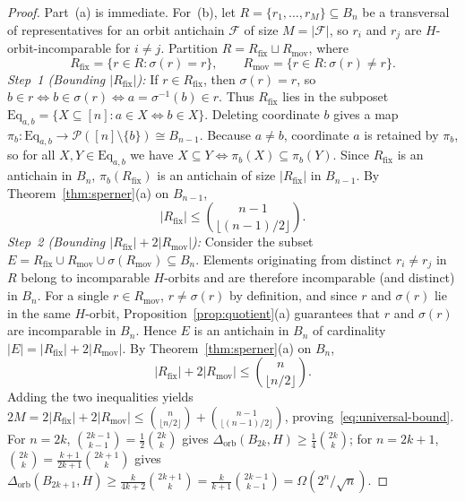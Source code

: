 \documentclass[11pt,a4paper]{article}
\theoremstyle{definition}
\newcommand{\Bn}{B_n}
\newcommand{\Dorb}{\Delta_{\mathrm{orb}}}
\begin{document}
\begin{proof}
Part~(a) is immediate. For~(b), let $R = \{r_1, \dots, r_M\} \subseteq \Bn$ be a transversal of representatives for an orbit antichain $\mathcal{F}$ of size $M = |\mathcal{F}|$, so $r_i$ and $r_j$ are $H$-orbit-incomparable for $i \neq j$. Partition $R = R_{\mathrm{fix}} \sqcup R_{\mathrm{mov}}$, where
\[
  R_{\mathrm{fix}} = \{r \in R : \sigma(r) = r\}, \qquad R_{\mathrm{mov}} = \{r \in R : \sigma(r) \neq r\}.
\]
\emph{Step~1 (Bounding $|R_{\mathrm{fix}}|$):} If $r \in R_{\mathrm{fix}}$, then $\sigma(r) = r$, so $b \in r \iff b \in \sigma(r) \iff a = \sigma^{-1}(b) \in r$. Thus $R_{\mathrm{fix}}$ lies in the subposet $\mathrm{Eq}_{a,b} = \{X \subseteq [n] : a \in X \iff b \in X\}$. Deleting coordinate $b$ gives a map $\pi_b : \mathrm{Eq}_{a,b} \to \mathcal{P}([n]\setminus\{b\}) \cong B_{n-1}$. Because $a \neq b$, coordinate $a$ is retained by $\pi_b$, so for all $X, Y \in \mathrm{Eq}_{a,b}$ we have $X \subseteq Y \iff \pi_b(X) \subseteq \pi_b(Y)$. Since $R_{\mathrm{fix}}$ is an antichain in $\Bn$, $\pi_b(R_{\mathrm{fix}})$ is an antichain of size $|R_{\mathrm{fix}}|$ in $B_{n-1}$. By Theorem~\ref{thm:sperner}(a) on $B_{n-1}$,
\[
  |R_{\mathrm{fix}}| \le \binom{n-1}{\lfloor (n-1)/2 \rfloor}.
\]
\emph{Step~2 (Bounding $|R_{\mathrm{fix}}| + 2|R_{\mathrm{mov}}|$):} Consider the subset $E = R_{\mathrm{fix}} \cup R_{\mathrm{mov}} \cup \sigma(R_{\mathrm{mov}}) \subseteq \Bn$. Elements originating from distinct $r_i \neq r_j$ in $R$ belong to incomparable $H$-orbits and are therefore incomparable (and distinct) in $\Bn$. For a single $r \in R_{\mathrm{mov}}$, $r \neq \sigma(r)$ by definition, and since $r$ and $\sigma(r)$ lie in the same $H$-orbit, Proposition~\ref{prop:quotient}(a) guarantees that $r$ and $\sigma(r)$ are incomparable in $\Bn$. Hence $E$ is an antichain in $\Bn$ of cardinality $|E| = |R_{\mathrm{fix}}| + 2|R_{\mathrm{mov}}|$. By Theorem~\ref{thm:sperner}(a) on $\Bn$,
\[
  |R_{\mathrm{fix}}| + 2|R_{\mathrm{mov}}| \le \binom{n}{\lfloor n/2 \rfloor}.
\]
Adding the two inequalities yields $2M = 2|R_{\mathrm{fix}}| + 2|R_{\mathrm{mov}}| \le \binom{n}{\lfloor n/2 \rfloor} + \binom{n-1}{\lfloor (n-1)/2 \rfloor}$, proving~\eqref{eq:universal-bound}. For $n = 2k$, $\binom{2k-1}{k-1} = \frac{1}{2}\binom{2k}{k}$ gives $\Dorb(B_{2k}, H) \ge \frac{1}{4}\binom{2k}{k}$; for $n = 2k+1$, $\binom{2k}{k} = \frac{k+1}{2k+1}\binom{2k+1}{k}$ gives $\Dorb(B_{2k+1}, H) \ge \frac{k}{4k+2}\binom{2k+1}{k} = \frac{k}{k+1}\binom{2k-1}{k-1} = \Omega(2^n/\sqrt{n})$.
\end{proof}
\end{document}
